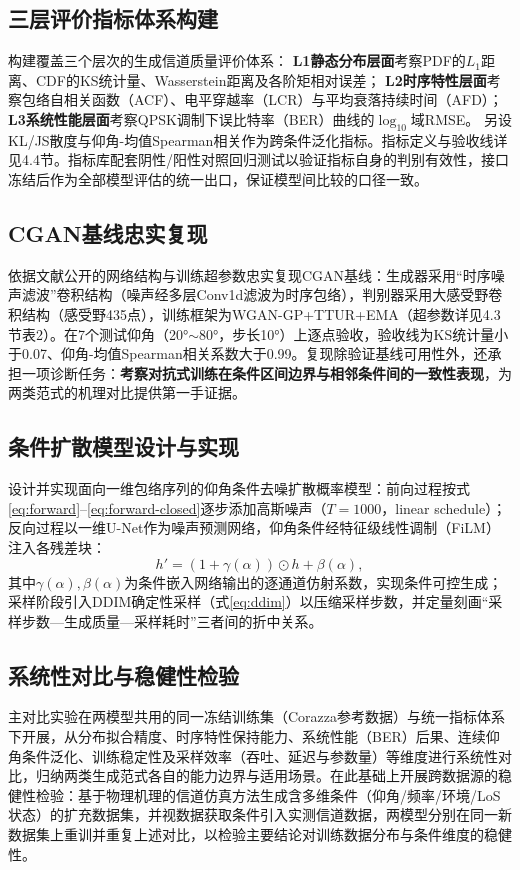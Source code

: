 \documentclass[12pt, a4paper]{ctexart}
\begin{document}
\subsection{三层评价指标体系构建}
构建覆盖三个层次的生成信道质量评价体系：
\textbf{L1静态分布层面}考察PDF的$L_1$距离、CDF的KS统计量、Wasserstein距离及各阶矩相对误差；
\textbf{L2时序特性层面}考察包络自相关函数（ACF）、电平穿越率（LCR）与平均衰落持续时间（AFD）；
\textbf{L3系统性能层面}考察QPSK调制下误比特率（BER）曲线的$\log_{10}$域RMSE。
另设KL/JS散度与仰角-均值Spearman相关作为跨条件泛化指标。指标定义与验收线详见4.4节。指标库配套阴性/阳性对照回归测试以验证指标自身的判别有效性，接口冻结后作为全部模型评估的统一出口，保证模型间比较的口径一致。

\subsection{CGAN基线忠实复现}
依据文献\cite{chen2026cgan}公开的网络结构与训练超参数忠实复现CGAN基线：生成器采用“时序噪声滤波”卷积结构（噪声经多层Conv1d滤波为时序包络），判别器采用大感受野卷积结构（感受野435点），训练框架为WGAN-GP+TTUR+EMA（超参数详见4.3节表2）。在7个测试仰角（20°$\sim$80°，步长10°）上逐点验收，验收线为KS统计量小于0.07、仰角-均值Spearman相关系数大于0.99。复现除验证基线可用性外，还承担一项诊断任务：\textbf{考察对抗式训练在条件区间边界与相邻条件间的一致性表现}，为两类范式的机理对比提供第一手证据。

\subsection{条件扩散模型设计与实现}
设计并实现面向一维包络序列的仰角条件去噪扩散概率模型：前向过程按式\eqref{eq:forward}--\eqref{eq:forward-closed}逐步添加高斯噪声（$T=1000$，linear schedule）；反向过程以一维U-Net作为噪声预测网络，仰角条件经特征级线性调制（FiLM）注入各残差块：
\begin{equation}
h' = (1+\gamma(\alpha)) \odot h + \beta(\alpha),
\label{eq:film}
\end{equation}
其中$\gamma(\alpha),\beta(\alpha)$为条件嵌入网络输出的逐通道仿射系数，实现条件可控生成；采样阶段引入DDIM确定性采样（式\eqref{eq:ddim}）以压缩采样步数，并定量刻画“采样步数—生成质量—采样耗时”三者间的折中关系。

\subsection{系统性对比与稳健性检验}
主对比实验在两模型共用的同一冻结训练集（Corazza参考数据）与统一指标体系下开展，从分布拟合精度、时序特性保持能力、系统性能（BER）后果、连续仰角条件泛化、训练稳定性及采样效率（吞吐、延迟与参数量）等维度进行系统性对比，归纳两类生成范式各自的能力边界与适用场景。在此基础上开展跨数据源的稳健性检验：基于物理机理的信道仿真方法生成含多维条件（仰角/频率/环境/LoS状态）的扩充数据集，并视数据获取条件引入实测信道数据，两模型分别在同一新数据集上重训并重复上述对比，以检验主要结论对训练数据分布与条件维度的稳健性。
\end{document}
